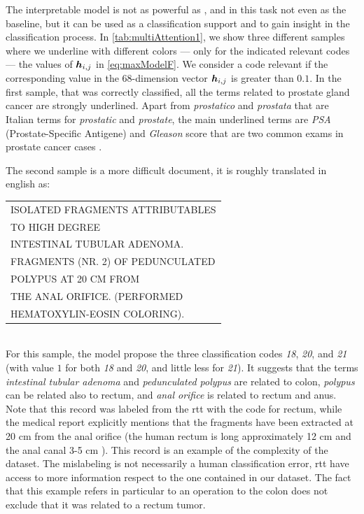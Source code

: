 The interpretable model is not as powerful as \maxp{}, and in this task
not even as the baseline, but it can be used as a
classification support and to 
gain insight in the classification process. In
\cref{tab:multiAttention1}, we show three different samples where we
underline with different colors --- only for the indicated relevant
codes --- the values of $\bm{h}_{i,j}$ in \eqref{eq:maxModelF}. We
consider a code relevant if the corresponding value in the
68-dimension vector $\bm{h}_{i,j}$ is greater than $0.1$. In the
first sample, that was correctly classified, all the terms related to
prostate gland cancer are strongly underlined. Apart from
\emph{prostatico} and \emph{prostata} that are Italian terms for
\emph{prostatic} and \emph{prostate}, the main underlined terms are
\emph{PSA} (Prostate-Specific Antigene) and \emph{Gleason} score that
are two common exams in prostate cancer cases
\cite{brimo2013prostate}.

The second sample is a more difficult
document, it is roughly translated in english as:\\
\begin{small}
  \ttfamily
  \begin{tabular}{l}
    ISOLATED FRAGMENTS ATTRIBUTABLES\\
    TO HIGH DEGREE\\
    INTESTINAL TUBULAR ADENOMA.\\
    FRAGMENTS (NR. 2) OF PEDUNCULATED\\
    POLYPUS AT 20 CM FROM\\
    THE ANAL ORIFICE. (PERFORMED\\
    HEMATOXYLIN-EOSIN COLORING).
\end{tabular}
\end{small}\\
For this sample, the model propose the three classification codes \emph{18},
\emph{20}, and \emph{21} (with value $1$ for both \emph{18} and
\emph{20}, and little less for \emph{21}). It suggests that the terms
\emph{intestinal tubular adenoma} and \emph{pedunculated polypus} are
related to colon, \emph{polypus} can be related also to rectum, and
\emph{anal orifice} is related to rectum and anus. Note that this
record was labeled from the \ac{rtt} with the code for rectum, while
the medical report 
explicitly mentions that the fragments have been extracted at 20 cm
from the anal orifice (the human rectum is long approximately 12 cm
and the anal canal 3-5 cm \cite{greene2006ajcc}). This record is an
example of the complexity of the dataset. The mislabeling is not
necessarily a human classification error, \ac{rtt} have access to more
information respect to the one contained in our dataset. The fact that
this example refers in particular to an operation to the colon does not
exclude that it was related to a rectum tumor.

